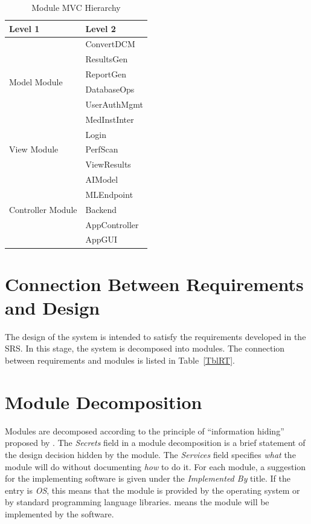 \documentclass[12pt, titlepage]{article}
\begin{document}
\begin{table}[H]
  \centering
  \begin{tabular}{p{} p{}}
    \toprule
    \textbf{Level 1} & \textbf{Level 2} \\
    \midrule

    \multirow{6}{0.3\textwidth}{Model Module} & ConvertDCM \\
    & ResultsGen \\
    & ReportGen \\
    & DatabaseOps \\
    & UserAuthMgmt \\
    & MedInstInter \\
    \midrule

    \multirow{3}{0.3\textwidth}{View Module} & Login \\ 
    & PerfScan \\
    & ViewResults \\
    \midrule

    \multirow{5}{0.3\textwidth}{Controller Module} & AIModel \\
    & MLEndpoint \\
    & Backend \\
    & AppController \\
    & AppGUI \\
    \bottomrule

  \end{tabular}
  \caption{Module MVC Hierarchy}
  \label{TblMMH}
\end{table}

\section{Connection Between Requirements and Design} \label{SecConnection}

The design of the system is intended to satisfy the requirements developed in
the SRS. In this stage, the system is decomposed into modules. The connection
between requirements and modules is listed in Table~\ref{TblRT}.

\section{Module Decomposition} \label{SecMD}

Modules are decomposed according to the principle of ``information hiding''
proposed by \citet{ParnasEtAl1984}. The \emph{Secrets} field in a module
decomposition is a brief statement of the design decision hidden by the
module. The \emph{Services} field specifies \emph{what} the module will do
without documenting \emph{how} to do it. For each module, a suggestion for the
implementing software is given under the \emph{Implemented By} title. If the
entry is \emph{OS}, this means that the module is provided by the operating
system or by standard programming language libraries.  \emph{\progname{}} means the
module will be implemented by the \progname{} software.
\end{document}
